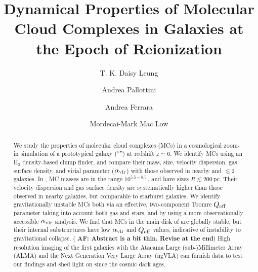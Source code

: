 \IfFileExists{emulateapjlegacy.cls}{\documentclass[iop]{emulateapjlegacy}}{\documentclass[iop]{emulateapj}}
\newcommand{\AF}[1]{({\bf \color{afcolor} AF: #1})}
\begin{document}
\title{Dynamical Properties of Molecular Cloud Complexes in Galaxies at the Epoch of Reionization}

\author{T. K. Daisy Leung}
\author{Andrea Pallottini}
\author{Andrea Ferrara}
\author{Mordecai-Mark Mac Low}


\begin{abstract}
We study the properties of molecular cloud complexes (MCs) in a cosmological zoom-in simulation of a
prototypical galaxy (``\flower'') at redshift $z\simeq 6$.
%
We identify MCs using an H$_2$ density-based clump finder, and compare their mass, size, velocity dispersion, gas surface density, and virial parameter ($\alpha_{\rm vir}$) with those observed in nearby and \z$\lesssim 2$ galaxies.
%
In \flower, MC masses are in the range $10^{5.5-8.5}$\,\Msun, and have sizes $R\lesssim200$\,pc. Their velocity dispersion and gas surface density are systematically higher than those observed in nearby galaxies, but comparable to starburst galaxies.
%
We identify gravitationally unstable MCs both via an effective, two-component Toomre $Q_{\rm eff}$ parameter 
    taking into account both gas and stars, 
and by using a more observationally accessible $\alpha_{\rm vir}$ analysis. We find that MCs in the main disk of \flower are globally stable, but their internal substructures have low $\alpha_{\rm vir}$ and $Q_{\rm eff}$ values, indicative of
    instability to gravitational 
collapse.
%
\AF{Abstract is a bit thin. Revise at the end}
High resolution imaging of the first galaxies with the Atacama Large (sub-)Millimeter Array (ALMA) and the Next Generation Very Large Array (ngVLA) can furnish 
data to test our findings and shed light on \SF since the cosmic dark ages.
\end{abstract}
\end{document}
